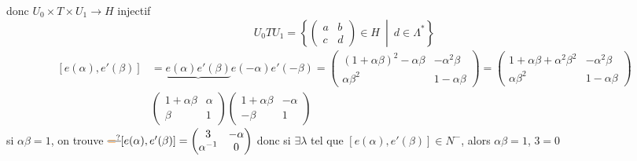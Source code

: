 donc $U_0\times T\times U_1\to{H}$ injectif
\[U_0TU_1=\left\{\begin{pmatrix}a&b\\c&d\end{pmatrix}\in{H}\ \middle|\ d\in\Lambda^*\right\}\]
\[\begin{aligned}
[e(\alpha),e'(\beta)]&=\underbrace{e(\alpha)e'(\beta)}e(-\alpha)e'(-\beta)=\begin{pmatrix}(1+\alpha\beta)^2-\alpha\beta&-\alpha^2\beta\\\alpha\beta^2&1-\alpha\beta\end{pmatrix}=\begin{pmatrix}1+\alpha\beta+\alpha^2\beta^2&-\alpha^2\beta\\\alpha\beta^2&1-\alpha\beta\end{pmatrix}\\
&\begin{pmatrix}1+\alpha\beta&\alpha\\\beta&1\end{pmatrix}\begin{pmatrix}1+\alpha\beta&-\alpha\\-\beta&1\end{pmatrix}
\end{aligned}\]
si $\alpha\beta=1$, on trouve $\deleted{\unsure{=}}[e(\alpha),e'(\beta)]=\begin{pmatrix}3&-\alpha\\\alpha^{-1}&0\end{pmatrix}$ 
donc si $\exists \lambda$ tel que $[e(\alpha),e'(\beta)]\in N^-$, alors $\alpha\beta=1$, $3=0$
